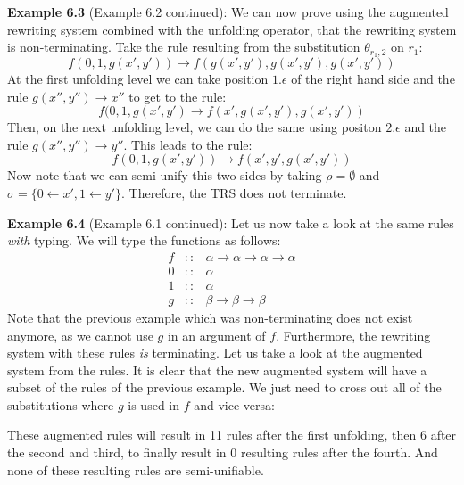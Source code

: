 \textbf{Example 6.3} (Example 6.2 continued): We can now prove using the augmented rewriting system combined with the unfolding operator, that the rewriting system is non-terminating. Take the rule resulting from the substitution $\theta_{r_1, 2}$ on $r_1$: 
$$f(0, 1, g(x', y')) \rightarrow f(g(x', y'), g(x', y'), g(x', y'))$$
At the first unfolding level we can take position $1.\epsilon$ of the right hand side and the rule $g(x'', y'') \rightarrow x''$ to get to the rule:
$$f(0, 1, g(x', y') \rightarrow f(x', g(x', y'), g(x', y'))$$ 
Then, on the next unfolding level, we can do the same using positon $2.\epsilon$ and the rule $g(x'', y'') \rightarrow y''$. This leads to the rule:
$$f(0, 1, g(x', y')) \rightarrow f(x', y', g(x', y'))$$
Now note that we can semi-unify this two sides by taking $\rho = \emptyset$ and $\sigma = \{ 0 \leftarrow x', 1 \leftarrow y' \}$. Therefore, the TRS does not terminate.

\textbf{Example 6.4} (Example 6.1 continued): Let us now take a look at the same rules \textit{with} typing. We will type the functions as follows:
\[
\begin{array}{rcl}
    f & :: & \alpha \rightarrow \alpha \rightarrow \alpha \rightarrow \alpha \\
    0 & :: & \alpha \\
    1 & :: & \alpha \\
    g & :: & \beta \rightarrow \beta \rightarrow \beta 
\end{array}
\]
Note that the previous example which was non-terminating does not exist anymore, as we cannot use $g$ in an argument of $f$. Furthermore, the rewriting system with these rules \textit{is} terminating. Let us take a look at the augmented system from the rules. It is clear that the new augmented system will have a subset of the rules of the previous example. We just need to cross out all of the substitutions where $g$ is used in $f$ and vice versa:
\begin{center}
\end{center}
These augmented rules will result in 11 rules after the first unfolding, then 6 after the second and third, to finally result in 0 resulting rules after the fourth. And none of these resulting rules are semi-unifiable. 

